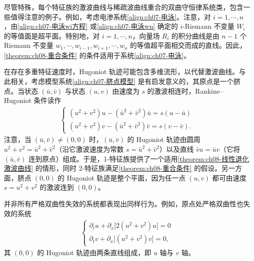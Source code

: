 \documentclass[../../main.tex]{subfiles}
\begin{document}
尽管特殊，每个特征族的激波曲线与稀疏波曲线重合的双曲守恒律系统类，包含一些值得注意的例子。例如，考虑电渗系统\eqref{align:ch07-电泳}。注意，对 $i=1,\cdots,n$，由\eqref{align:ch07-电泳wi方程} 或\eqref{align:ch07-电泳wn} 确定的 $i$-Riemann 不变量 $W_i$ 的等值面是超平面。特别地，对 $i=1,\cdots,n$，向量场 $R_i$ 的积分曲线是由 $n-1$ 个 Riemann 不变量 $w_1,\cdots,w_{i-1},w_{i+1},\cdots,w_n$ 的等值超平面相交而成的直线。因此，\cref{theorem:ch08-重合条件} 的条件适用于系统\eqref{align:ch07-电泳}。

在存在多重特征速度时，Hugoniot 轨迹可能包含多维流形，以代替激波曲线。与此相关，考虑模型系统\eqref{align:ch07-脐点模型} 是有启发意义的，其原点是一个脐点。当状态 $(\bar u,\bar v)$ 与状态 $(u,v)$ 由速度为 $s$ 的激波相连时，Rankine--Hugoniot 条件读作
\begin{align}
\begin{cases}
(u^2+v^2)u-(\bar u^2+\bar v^2)\bar u=s(u-\bar u)\\
(u^2+v^2)v-(\bar u^2+\bar v^2)\bar v=s(v-\bar v).
\end{cases}
\label{align:ch08-umiblic}
\end{align}
注意，当 $(\bar u,\bar v)\neq(0,0)$ 时，$(\bar u,\bar v)$ 的 Hugoniot 轨迹由圆周 $u^2+v^2=\bar u^2+\bar v^2$（沿它激波速度为常数 $s=\bar u^2+\bar v^2$）以及直线 $\bar v u=\bar u v$（它将 $(\bar u,\bar v)$ 连到原点）组成。于是，1-特征族提供了一个适用\cref{theorem:ch08-线性退化激波曲线} 的情形，同时 2-特征族满足\cref{theorem:ch08-重合条件} 的假设。另一方面，脐点 $(0,0)$ 的 Hugoniot 轨迹是整个平面，因为任一点 $(u,v)$ 都可由速度 $s=u^2+v^2$ 的激波连到 $(0,0)$。

并非所有严格双曲性失效的系统都表现出同样行为。例如，原点处严格双曲性也失效的系统
\begin{align}
\begin{cases}
\partial_t u+\partial_x\big[2(u^2+v^2)u\big]=0\\
\partial_t v+\partial_x\big[(u^2+v^2)v\big]=0,
\end{cases}
\label{align:ch08-非脐点}
\end{align}
其 $(0,0)$ 的 Hugoniot 轨迹由两条直线组成，即 $u$ 轴与 $v$ 轴。
\end{document}
